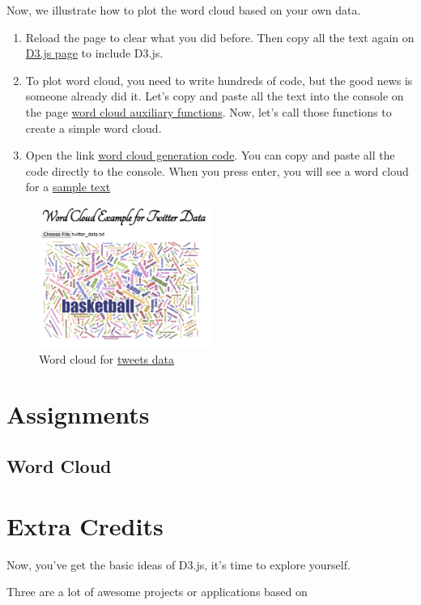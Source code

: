 \documentclass[a4paper, 11pt]{article}
\begin{document}
Now, we illustrate how to plot the word cloud based on your own data.
\begin{enumerate}
\item Reload the page to clear what you did before. Then copy all the text again on \href{https://raw.githubusercontent.com/mbostock/d3/master/d3.min.js}{D3.js page} to include D3.js.
\item To plot word cloud, you need to write hundreds of code, but the good news is someone already did it. Let's copy and paste all the text into the console on the page \href{https://gist.githubusercontent.com/emeeks/3361332/raw/61cf57523fe8cf314333e5f60cc266351fec2017/d3.layout.cloud.js}{word cloud auxiliary functions}. Now, let's call those functions to create a simple word cloud. 
\item Open the link \href{}{word cloud generation code}. You can copy and paste all the code directly to the console. When you press enter, you will see a word cloud for a \href{http://www.jasondavies.com/wordtree/cat-in-the-hat.txt}{sample text}

\end{enumerate}


\begin{figure}[h!]
  \centering
      \includegraphics[width=0.5\textwidth]{word_cloud.png}
  \caption{Word cloud for \href{http://nymph332088.github.io/CIS4340/labassignments/Lab2/twitter_data.txt}{tweets data}}
  \label{fig:wordcloud}
\end{figure}

\section{Assignments}
\subsection{Word Cloud}


\section{Extra Credits}
Now, you've get the basic ideas of D3.js, it's time to explore yourself.

Three are a lot of awesome projects or applications based on 
\end{document}
